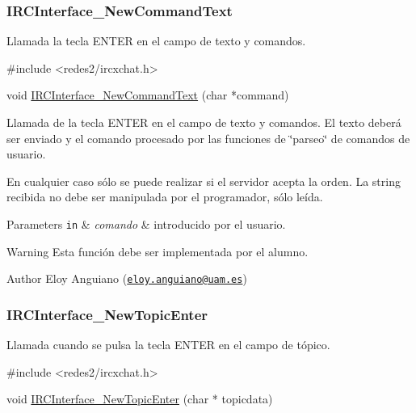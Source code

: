  \hypertarget{IRCInterface_NewCommandText}{}\subsubsection{I\-R\-C\-Interface\-\_\-\-New\-Command\-Text}\label{IRCInterface_NewCommandText}
Llamada la tecla E\-N\-T\-E\-R en el campo de texto y comandos.


\begin{DoxyCode}
\textcolor{preprocessor}{#include <redes2/ircxchat.h>}

\textcolor{keywordtype}{void} \hyperlink{xchat2_8c_a214e10b19c8be028fb35d2a7abf3f798}{IRCInterface\_NewCommandText} (\textcolor{keywordtype}{char} *command)
\end{DoxyCode}


Llamada de la tecla E\-N\-T\-E\-R en el campo de texto y comandos. El texto deberá ser enviado y el comando procesado por las funciones de \char`\"{}parseo\char`\"{} de comandos de usuario.

En cualquier caso sólo se puede realizar si el servidor acepta la orden. La string recibida no debe ser manipulada por el programador, sólo leída.


\begin{DoxyParams}[1]{Parameters}
\mbox{\tt in}  & {\em comando} & introducido por el usuario.\\
\hline
\end{DoxyParams}
\begin{DoxyWarning}{Warning}
Esta función debe ser implementada por el alumno.
\end{DoxyWarning}
\begin{DoxyAuthor}{Author}
Eloy Anguiano (\href{mailto:eloy.anguiano@uam.es}{\tt eloy.\-anguiano@uam.\-es})
\end{DoxyAuthor}


 \hypertarget{IRCInterface_NewTopicEnter}{}\subsubsection{I\-R\-C\-Interface\-\_\-\-New\-Topic\-Enter}\label{IRCInterface_NewTopicEnter}
Llamada cuando se pulsa la tecla E\-N\-T\-E\-R en el campo de tópico.


\begin{DoxyCode}
\textcolor{preprocessor}{#include <redes2/ircxchat.h>}

\textcolor{keywordtype}{void} \hyperlink{xchat2_8c_a080cf34ff506481737f6d08af60ca92b}{IRCInterface\_NewTopicEnter} (\textcolor{keywordtype}{char} * topicdata)
\end{DoxyCode}


